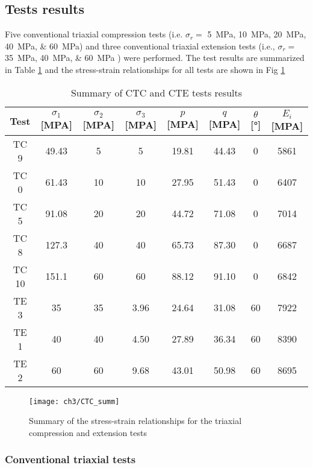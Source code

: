 \subsection{Tests results}


Five conventional triaxial compression tests (i.e. $\sigma_r = $ \SIlist{5;10;20;40;60}{MPa}) and three conventional triaxial extension tests (i.e., $\sigma_r = $ \SIlist{35;40;60}{MPa} ) were performed. The test results are summarized in Table \ref{tb3:CTC-CTE-results} and the stress-strain relationships for all tests are shown in Fig \ref{fig3:8}

\begin{table}
    \centering
    \begin{tabular}{cccccccc}
        \hline 
        Test & $\sigma_1$ [\si{MPA}] & $\sigma_2$ [\si{MPA}] &$\sigma_3$ [\si{MPA}] & $p$ [\si{MPA}] & $q$ [\si{MPA}] & $\theta$ [\si{\degree}] & $E_i$ [\si{MPA}] \\
        \hline
        \hline
        TC 9  & 49.43 & 5  & 5    & 19.81 & 44.43 & 0  & 5861  \\ 
        TC 0  & 61.43 & 10 & 10   & 27.95 & 51.43 & 0  & 6407  \\ 
        TC 5  & 91.08 & 20 & 20   & 44.72 & 71.08 & 0  & 7014  \\ 
        TC 8  & 127.3 & 40 & 40   & 65.73 & 87.30 & 0  & 6687  \\ 
        TC 10 & 151.1 & 60 & 60   & 88.12 & 91.10 & 0  & 6842  \\ 
        \hline
        \hline
        TE 3  & 35    & 35 & 3.96 & 24.64 & 31.08 & 60 & 7922  \\ 
        TE 1  & 40    & 40 & 4.50 & 27.89 & 36.34 & 60 & 8390  \\ 
        TE 2  & 60    & 60 & 9.68 & 43.01 & 50.98 & 60 & 8695  \\
        \hline
    \end{tabular}
    \caption{Summary of CTC and CTE tests results}
    \label{tb3:CTC-CTE-results}
\end{table}

\begin{figure}[tb]
    \centering
    \texttt{[image: ch3/CTC\_summ]}
    \caption{Summary of the stress-strain relationships for the triaxial compression and extension tests}
    \label{fig3:8}
\end{figure} 

\subsubsection{Conventional triaxial tests}

